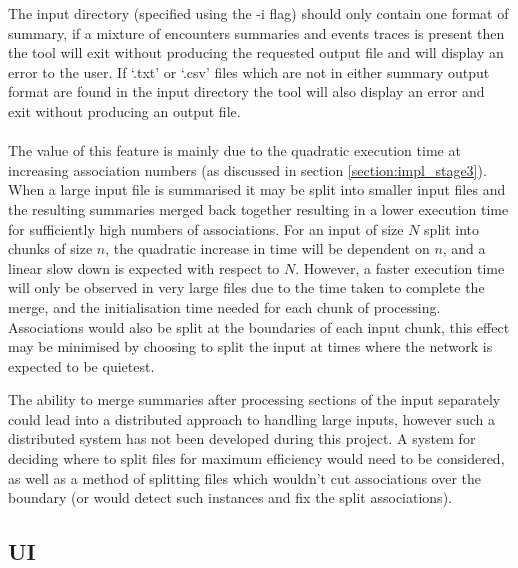 The input directory (specified using the -i flag) should only contain one format of summary, if a mixture of encounters summaries and events traces is present then the tool will exit without producing the requested output file and will display an error to the user. If `.txt' or `.csv' files which are not in either summary output format are found in the input directory the tool will also display an error and exit without producing an output file.\\\\
The value of this feature is mainly due to the quadratic execution time at increasing association numbers (as discussed in section \ref{section:impl_stage3}). When a large input file is summarised it may be split into smaller input files and the resulting summaries merged back together resulting in a lower execution time for sufficiently high numbers of associations. For an input of size $N$ split into chunks of size $n$, the quadratic increase in time will be dependent on $n$, and a linear slow down is expected with respect to $N$. However, a faster execution time will only be observed in very large files due to the time taken to complete the merge, and the initialisation time needed for each chunk of processing. Associations would also be split at the boundaries of each input chunk, this effect may be minimised by choosing to split the input at times where the network is expected to be quietest.

The ability to merge summaries after processing sections of the input separately could lead into a distributed approach to handling large inputs, however such a distributed system has not been developed during this project. A system for deciding where to split files for maximum efficiency would need to be considered, as well as a method of splitting files which wouldn't cut associations over the boundary (or would detect such instances and fix the split associations).

\subsection{UI} %
